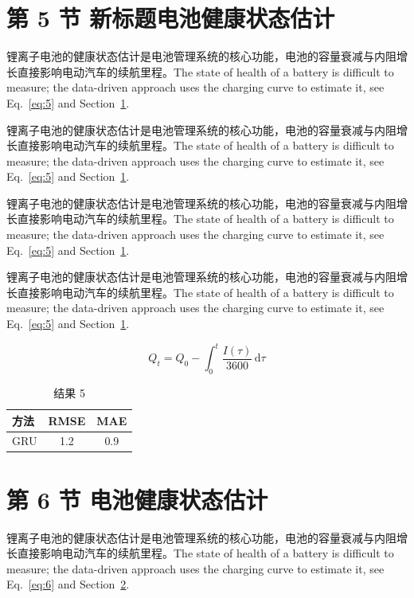 \documentclass[UTF8,fontset=mac]{ctexart}
\begin{document}
\section{第 5 节 新标题电池健康状态估计}\label{sec:5}
锂离子电池的健康状态估计是电池管理系统的核心功能，电池的容量衰减与内阻增长直接影响电动汽车的续航里程\cite{a2020}。The state of health of a battery is difficult to measure; the data-driven approach uses the charging curve to estimate it, see Eq.~\eqref{eq:5} and Section~\ref{sec:5}.

锂离子电池的健康状态估计是电池管理系统的核心功能，电池的容量衰减与内阻增长直接影响电动汽车的续航里程\cite{a2020}。The state of health of a battery is difficult to measure; the data-driven approach uses the charging curve to estimate it, see Eq.~\eqref{eq:5} and Section~\ref{sec:5}.

锂离子电池的健康状态估计是电池管理系统的核心功能，电池的容量衰减与内阻增长直接影响电动汽车的续航里程\cite{a2020}。The state of health of a battery is difficult to measure; the data-driven approach uses the charging curve to estimate it, see Eq.~\eqref{eq:5} and Section~\ref{sec:5}.

锂离子电池的健康状态估计是电池管理系统的核心功能，电池的容量衰减与内阻增长直接影响电动汽车的续航里程\cite{a2020}。The state of health of a battery is difficult to measure; the data-driven approach uses the charging curve to estimate it, see Eq.~\eqref{eq:5} and Section~\ref{sec:5}.

\begin{equation}\label{eq:5}
  Q_t = Q_0 - \int_0^t \frac{I(\tau)}{3600}\,\mathrm{d}\tau
\end{equation}
\begin{table}[h]\centering\begin{tabular}{lcc}\toprule 方法 & RMSE & MAE\\\midrule GRU & 1.2 & 0.9\\\bottomrule\end{tabular}\caption{结果 5}\end{table}

\section{第 6 节 电池健康状态估计}\label{sec:6}
锂离子电池的健康状态估计是电池管理系统的核心功能，电池的容量衰减与内阻增长直接影响电动汽车的续航里程\cite{a2020}。The state of health of a battery is difficult to measure; the data-driven approach uses the charging curve to estimate it, see Eq.~\eqref{eq:6} and Section~\ref{sec:6}.
\end{document}
